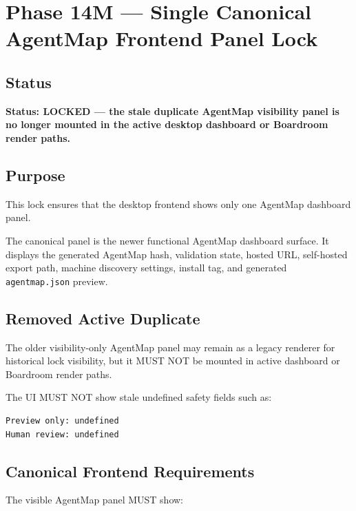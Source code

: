 \section{Phase 14M --- Single Canonical AgentMap Frontend Panel Lock}
\label{sec:phase14-agentmap-single-canonical-panel-lock}

\subsection{Status}

\textbf{Status: LOCKED --- the stale duplicate AgentMap visibility panel is no longer mounted in the active desktop dashboard or Boardroom render paths.}

\subsection{Purpose}

This lock ensures that the desktop frontend shows only one AgentMap dashboard panel.

The canonical panel is the newer functional AgentMap dashboard surface. It displays the generated AgentMap hash, validation state, hosted URL, self-hosted export path, machine discovery settings, install tag, and generated \texttt{agentmap.json} preview.

\subsection{Removed Active Duplicate}

The older visibility-only AgentMap panel may remain as a legacy renderer for historical lock visibility, but it MUST NOT be mounted in active dashboard or Boardroom render paths.

The UI MUST NOT show stale undefined safety fields such as:

\begin{verbatim}
Preview only: undefined
Human review: undefined
\end{verbatim}

\subsection{Canonical Frontend Requirements}

The visible AgentMap panel MUST show:

